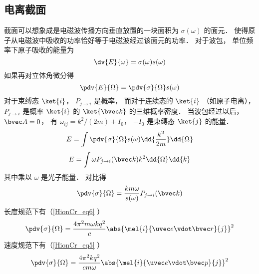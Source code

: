 \subsection{电离截面}
截面可以想象成是电磁波传播方向垂直放置的一块面积为 $\sigma(\omega)$ 的面元． 使得原子从电磁波中吸收的功率恰好等于电磁波经过该面元的功率． 对于波包， 单位频率下原子吸收的能量为
\begin{equation}
\dv{E}{\omega} = \sigma(\omega) s(\omega)
\end{equation}
如果再对立体角微分得
\begin{equation}
\pdv{E}{\Omega} = \pdv{\sigma}{\Omega} s(\omega)
\end{equation}
对于束缚态 $\ket{i}$， $P_{j\to i}$ 是概率， 而对于连续态的 $\ket{i}$ （如原子电离）， $P_{j\to i}$ 是概率 $\ket{i}$ 的 $\ket{\bvec k}$ 的三维概率密度． 当波包经过以后， $\bvec A = 0$， 有 $\omega_{ij} = k^2/(2m) + I_0$， $-I_0$ 是束缚态 $\ket{j}$ 的能量．
\begin{equation}
E = \int \pdv{\sigma}{\Omega} s(\omega) \dd{\frac{k^2}{2m}}\dd{\Omega}
\end{equation}
\begin{equation}
E = \int \omega P_{j\to i}(\bvec k) k^2\dd{\Omega}\dd{k}
\end{equation}
其中乘以 $\omega$ 是光子能量． 对比得
\begin{equation}
\pdv{\sigma}{\Omega} = \frac{km \omega}{s(\omega)} P_{j\to i}(\bvec k)
\end{equation}
长度规范下有（\autoref{HionCr_eq6} ）
\begin{equation}
\pdv{\sigma}{\Omega} = \frac{4\pi^2 m\omega k q^2}{c} \abs{\mel{i}{\uvec e \vdot\bvec r}{j}}^2
\end{equation}
速度规范下有（\autoref{HionCr_eq5} ）
\begin{equation} %
\pdv{\sigma}{\Omega} = \frac{4\pi^2 k q^2}{c m \omega} \abs{\mel{i}{\uvec e \vdot \bvec p}{j}}^2
\end{equation}
